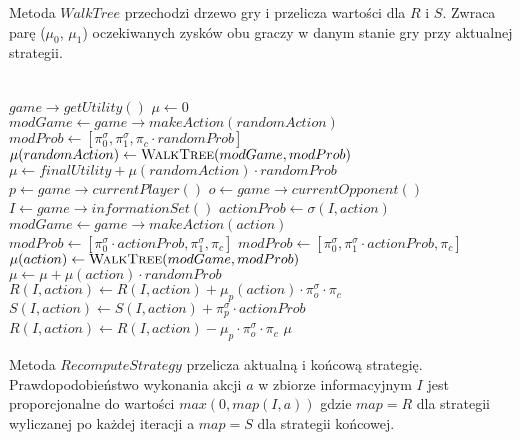 \documentclass[licencjacka]{pracamgr}
\begin{document}
\noindent
Metoda $WalkTree$ przechodzi drzewo gry i przelicza wartości dla $R$ i $S$. Zwraca parę
($\mu_0$, $\mu_1$) oczekiwanych zysków obu graczy w danym stanie gry przy aktualnej strategii. \\\\


\begin{algorithmic}
            \State \Return $game \rightarrow getUtility()$
        \EndIf
        \State $\mu \gets 0$ 
                \State $modGame \gets game \rightarrow makeAction(randomAction)$
                \State $modProb \gets [\pi_0^{\sigma}, \pi_1^{\sigma}, \pi_c \cdot randomProb ]$
                \State $\mu(randomAction) \gets \Call{WalkTree}{modGame, modProb}$
                \State $\mu \gets finalUtility + \mu(randomAction) \cdot randomProb$
            \EndFor
        \Else
            \State $p \gets game \rightarrow currentPlayer()$
            \State $o \gets game \rightarrow currentOpponent()$
            \State $I \gets game \rightarrow informationSet()$
                \State $actionProb \gets \sigma(I, action)$
                \State $modGame \gets game \rightarrow makeAction(action)$
                    \State $modProb \gets [\pi_0^{\sigma} \cdot actionProb, \pi_1^{\sigma}, \pi_c]$
                \Else
                    \State $modProb \gets [\pi_0^{\sigma}, \pi_1^{\sigma} \cdot actionProb, \pi_c]$
                \EndIf
                \State $\mu(action) \gets \Call{WalkTree}{modGame, modProb}$
                \State $\mu \gets \mu + \mu(action) \cdot randomProb$
                \State $R(I, action) \gets R(I, action) + \mu_{p}(action) \cdot \pi_{o}^{\sigma} \cdot \pi_c $
                \State $S(I, action) \gets S(I, action) + \pi_{p}^{\sigma} \cdot actionProb $
            \EndFor
                \State $R(I, action) \gets R(I, action) - \mu_{p} \cdot \pi_{o}^{\sigma} \cdot \pi_c $
            \EndFor
        \EndIf
    \State \Return $\mu$
    \EndFunction
\end{algorithmic}


$\,$ \\
Metoda $RecomputeStrategy$ przelicza aktualną i końcową strategię. Prawdopodobieństwo wykonania akcji $a$
w zbiorze informacyjnym $I$ jest proporcjonalne do wartości $max(0, map(I, a))$ gdzie $map=R$ dla strategii
wyliczanej po każdej iteracji a $map=S$ dla strategii końcowej.
\end{document}
